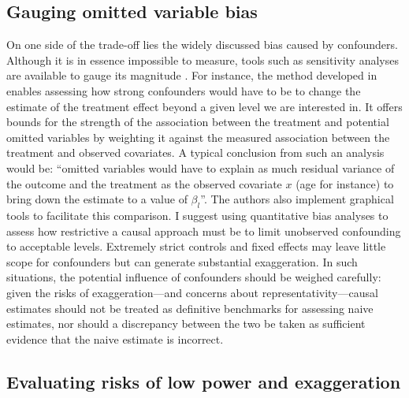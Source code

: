 \documentclass[usletter, 12pt]{article}
\begin{document}
	
		\subsection{Gauging omitted variable bias}
	
			On one side of the trade-off lies the widely discussed bias caused by confounders. Although it is in essence impossible to measure, tools such as sensitivity analyses are available to gauge its magnitude \citep{rosenbaum_observational_2002, middleton_bias_2016, oster_unobservable_2019, cinelli_making_2020}. For instance, the method developed in \cite{cinelli_making_2020} enables assessing how strong confounders would have to be to change the estimate of the treatment effect beyond a given level we are interested in. It offers bounds for the strength of the association between the treatment and potential omitted variables by weighting it against the measured association between the treatment and observed covariates. A typical conclusion from such an analysis would be: ``omitted variables would have to explain as much residual variance of the outcome and the treatment as the observed covariate $x$ (age for instance) to bring down the estimate to a value of $\beta_{l}$''. The authors also implement graphical tools to facilitate this comparison. I suggest using quantitative bias analyses to assess how restrictive a causal approach must be to limit unobserved confounding to acceptable levels. Extremely strict controls and fixed effects may leave little scope for confounders but can generate substantial exaggeration. In such situations, the potential influence of confounders should be weighed carefully: given the risks of exaggeration---and concerns about representativity---causal estimates should not be treated as definitive benchmarks for assessing naive estimates, nor should a discrepancy between the two be taken as sufficient evidence that the naive estimate is incorrect.
			
		\subsection{Evaluating risks of low power and exaggeration}
\end{document}
